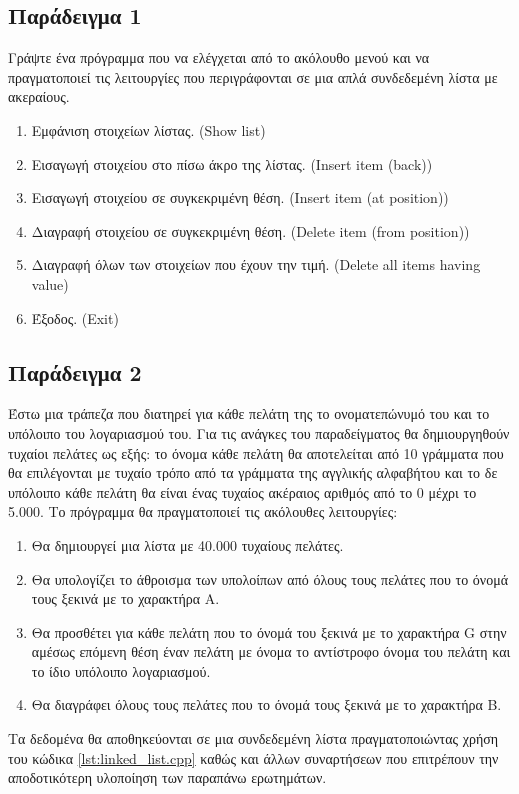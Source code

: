 \subsection{Παράδειγμα 1}
Γράψτε ένα πρόγραμμα που να ελέγχεται από το ακόλουθο μενού και να πραγματοποιεί τις λειτουργίες που περιγράφονται σε μια απλά συνδεδεμένη λίστα με ακεραίους.
\begin{enumerate}[nolistsep]
\item Εμφάνιση στοιχείων λίστας. (Show list)
\item Εισαγωγή στοιχείου στο πίσω άκρο της λίστας. (Insert item (back))
\item Εισαγωγή στοιχείου σε συγκεκριμένη θέση. (Insert item (at position)) 
\item Διαγραφή στοιχείου σε συγκεκριμένη θέση. (Delete item (from position))
\item Διαγραφή όλων των στοιχείων που έχουν την τιμή. (Delete all items having value)
\item Έξοδος. (Exit)
\end{enumerate}






\subsection{Παράδειγμα 2}
Έστω μια τράπεζα που διατηρεί για κάθε πελάτη της το ονοματεπώνυμό του και το υπόλοιπο του λογαριασμού του. Για τις ανάγκες του παραδείγματος θα δημιουργηθούν τυχαίοι πελάτες ως εξής: το όνομα κάθε πελάτη θα αποτελείται από 10 γράμματα που θα επιλέγονται με τυχαίο τρόπο από τα γράμματα της αγγλικής αλφαβήτου και το δε υπόλοιπο κάθε πελάτη θα είναι ένας τυχαίος ακέραιος αριθμός από το 0 μέχρι το 5.000. Το πρόγραμμα θα πραγματοποιεί τις ακόλουθες λειτουργίες: 
\begin{enumerate}[noitemsep,label=\Alph*]
\item Θα δημιουργεί μια λίστα με 40.000 τυχαίους πελάτες.
\item Θα υπολογίζει το άθροισμα των υπολοίπων από όλους τους πελάτες που το όνομά τους ξεκινά με το χαρακτήρα Α.
\item Θα προσθέτει για κάθε πελάτη που το όνομά του ξεκινά με το χαρακτήρα G στην αμέσως επόμενη θέση έναν πελάτη με όνομα το αντίστροφο όνομα του πελάτη και το ίδιο υπόλοιπο λογαριασμού.
\item Θα διαγράφει όλους τους πελάτες που το όνομά τους ξεκινά με το χαρακτήρα Β.
\end{enumerate}
Τα δεδομένα θα αποθηκεύονται σε μια συνδεδεμένη λίστα πραγματοποιώντας χρήση του κώδικα \ref{lst:linked_list.cpp} καθώς και άλλων συναρτήσεων που επιτρέπουν την αποδοτικότερη υλοποίηση των παραπάνω ερωτημάτων.

